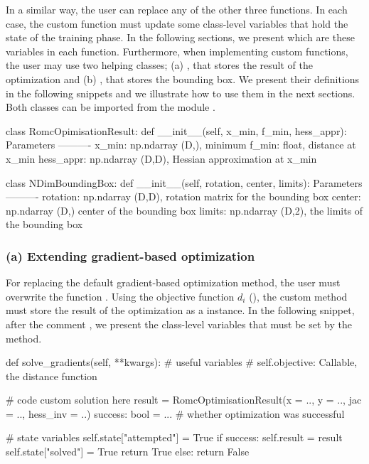 \documentclass[nojss]{jss}
\begin{document}
In a similar way, the user can replace any of the other three
functions. In each case, the custom function must update some
class-level variables that hold the state of the training phase. In
the following sections, we present which are these variables in each
function. Furthermore, when implementing custom functions, the user
may use two helping classes; (a) , that
stores the result of the optimization and (b) ,
that stores the bounding box. We present their definitions in the
following snippets and we illustrate how to use them in the next
sections. Both classes can be imported from the module
.


\begin{Code}
class RomcOpimisationResult:
    def __init__(self, x_min, f_min, hess_appr):
        Parameters
        ----------
        x_min: np.ndarray (D,), minimum
        f_min: float, distance at x_min
        hess_appr: np.ndarray (D,D), Hessian approximation at x_min

class NDimBoundingBox:
    def __init__(self, rotation, center, limits):
        Parameters
        ----------
        rotation: np.ndarray (D,D), rotation matrix for the bounding box
        center: np.ndarray (D,) center of the bounding box
        limits: np.ndarray (D,2), the limits of the bounding box
\end{Code}

\subsubsection*{(a) Extending gradient-based optimization}

For replacing the default gradient-based optimization method, the user
must overwrite the function . Using the
objective function \(d_i\) (), the custom method
must store the result of the optimization as a
 instance. In the following snippet,
after the comment , we present the
class-level variables that must be set by the method.

\begin{Code}
def solve_gradients(self, **kwargs):
    # useful variables
    # self.objective: Callable, the distance function

    # code custom solution here
    result = RomcOptimisationResult(x = .., y = .., jac = .., hess_inv = ..)
    success: bool = ... # whether optimization was successful

    # state variables
    self.state["attempted"] = True
    if success:
        self.result = result
        self.state["solved"] = True
        return True
    else:
        return False
\end{Code}
\end{document}
